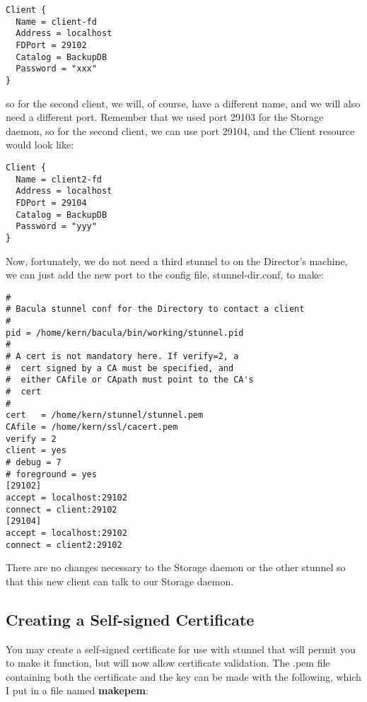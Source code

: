\footnotesize
\begin{verbatim}
Client {
  Name = client-fd
  Address = localhost
  FDPort = 29102
  Catalog = BackupDB
  Password = "xxx"
}
\end{verbatim}
\normalsize

so for the second client, we will, of course, have a different name, and we
will also need a different port. Remember that we used port 29103 for the
Storage daemon, so for the second client, we can use port 29104, and the
Client resource would look like: 

\footnotesize
\begin{verbatim}
Client {
  Name = client2-fd
  Address = localhost
  FDPort = 29104
  Catalog = BackupDB
  Password = "yyy"
}
\end{verbatim}
\normalsize

Now, fortunately, we do not need a third stunnel to on the Director's machine,
we can just add the new port to the config file, stunnel-dir.conf, to make: 

\footnotesize
\begin{verbatim}
#
# Bacula stunnel conf for the Directory to contact a client
#
pid = /home/kern/bacula/bin/working/stunnel.pid
#
# A cert is not mandatory here. If verify=2, a
#  cert signed by a CA must be specified, and
#  either CAfile or CApath must point to the CA's
#  cert
#
cert   = /home/kern/stunnel/stunnel.pem
CAfile = /home/kern/ssl/cacert.pem
verify = 2
client = yes
# debug = 7
# foreground = yes
[29102]
accept = localhost:29102
connect = client:29102
[29104]
accept = localhost:29102
connect = client2:29102
\end{verbatim}
\normalsize

There are no changes necessary to the Storage daemon or the other stunnel so
that this new client can talk to our Storage daemon. 

\subsection*{Creating a Self-signed Certificate}

You may create a self-signed certificate for use with stunnel that will permit
you to make it function, but will now allow certificate validation. The .pem
file containing both the certificate and the key can be made with the
following, which I put in a file named {\bf makepem}: 

